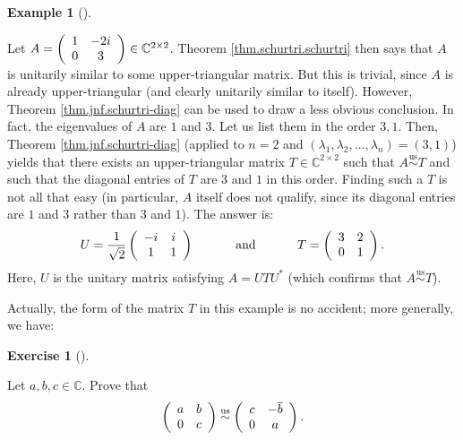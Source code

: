 \documentclass[numbers=enddot,12pt,final,onecolumn,notitlepage]{scrartcl}%
\newcounter{exer}
\numberwithin{exer}{subsection}
\theoremstyle{definition}
\newtheorem{exam}[theo]{Example}
\newenvironment{example}[1][]
{\begin{exam}[#1]\begin{leftbar}}
{\end{leftbar}\end{exam}}
\newtheorem{exmp}[exer]{Exercise}
\newenvironment{exercise}[1][]
{\begin{exmp}[#1]\begin{leftbar}}
{\end{leftbar}\end{exmp}}
\begin{document}
\begin{example}
\label{exa.jnf.schurtri-diag.2x2}Let $A=\left(
\begin{array}
[c]{cc}%
1 & -2i\\
0 & 3
\end{array}
\right)  \in\mathbb{C}^{2\times2}$. Theorem \ref{thm.schurtri.schurtri} then
says that $A$ is unitarily similar to some upper-triangular matrix. But this
is trivial, since $A$ is already upper-triangular (and clearly unitarily
similar to itself). However, Theorem \ref{thm.jnf.schurtri-diag} can be used
to draw a less obvious conclusion. In fact, the eigenvalues of $A$ are $1$ and
$3$. Let us list them in the order $3,1$. Then, Theorem
\ref{thm.jnf.schurtri-diag} (applied to $n=2$ and $\left(  \lambda_{1}%
,\lambda_{2},\ldots,\lambda_{n}\right)  =\left(  3,1\right)  $) yields that
there exists an upper-triangular matrix $T\in\mathbb{C}^{2\times2}$ such that
$A\overset{\operatorname*{us}}{\sim}T$ and such that the diagonal entries of
$T$ are $3$ and $1$ in this order. Finding such a $T$ is not all that easy (in
particular, $A$ itself does not qualify, since its diagonal entries are $1$
and $3$ rather than $3$ and $1$). The answer is:
\[
U=\dfrac{1}{\sqrt{2}}\left(
\begin{array}
[c]{cc}%
-i & i\\
1 & 1
\end{array}
\right)  \ \ \ \ \ \ \ \ \ \ \text{and}\ \ \ \ \ \ \ \ \ \ T=\left(
\begin{array}
[c]{cc}%
3 & 2\\
0 & 1
\end{array}
\right)  .
\]
Here, $U$ is the unitary matrix satisfying $A=UTU^{\ast}$ (which confirms that
$A\overset{\operatorname*{us}}{\sim}T$).
\end{example}

Actually, the form of the matrix $T$ in this example is no accident; more
generally, we have:

\begin{exercise}
\label{exe.jnf.schurtri-diag.2x2} Let $a,b,c\in\mathbb{C}$. Prove that%
\[
\left(
\begin{array}
[c]{cc}%
a & b\\
0 & c
\end{array}
\right)  \overset{\operatorname*{us}}{\sim}\left(
\begin{array}
[c]{cc}%
c & -\overline{b}\\
0 & a
\end{array}
\right)  .
\]

\end{exercise}
\end{document}
